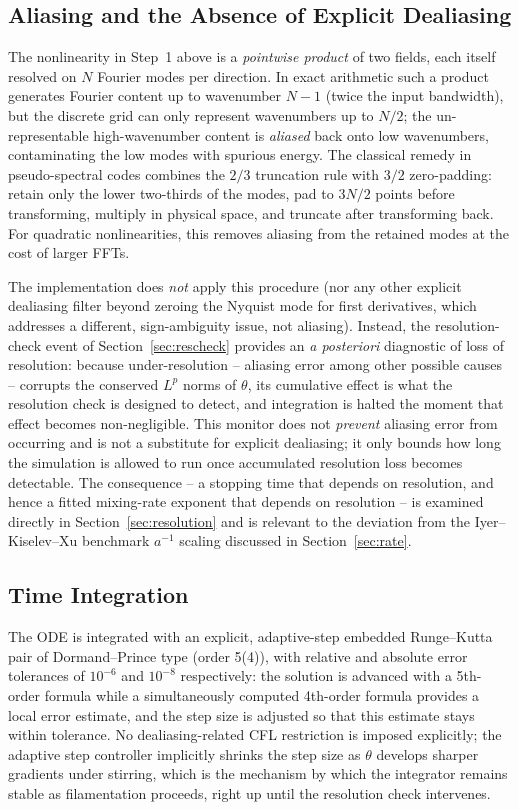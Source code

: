 \documentclass[12pt,a4paper]{article}
\theoremstyle{definition}
\theoremstyle{plain}
\begin{document}
\subsection{Aliasing and the Absence of Explicit Dealiasing}
\label{sec:aliasing}

The nonlinearity in Step~1 above is a \emph{pointwise product} of two
fields, each itself resolved on $N$ Fourier modes per direction. In exact
arithmetic such a product generates Fourier content up to wavenumber $N-1$
(twice the input bandwidth), but the discrete grid can only represent
wavenumbers up to $N/2$; the un-representable high-wavenumber content is
\emph{aliased} back onto low wavenumbers, contaminating the low modes with
spurious energy. The classical remedy in pseudo-spectral codes combines the
$2/3$ truncation rule with $3/2$ zero-padding: retain only the lower
two-thirds of the modes, pad to $3N/2$ points before transforming, multiply
in physical space, and truncate after transforming back. For quadratic
nonlinearities, this removes aliasing from the retained modes at the cost of
larger FFTs.

The implementation does \emph{not} apply this procedure (nor any other
explicit dealiasing filter beyond zeroing the Nyquist mode for first
derivatives, which addresses a different, sign-ambiguity issue, not
aliasing). Instead, the resolution-check event of
Section~\ref{sec:rescheck} provides an \emph{a posteriori} diagnostic of
loss of resolution: because under-resolution -- aliasing error among other
possible causes -- corrupts the conserved $L^p$ norms of $\theta$, its
cumulative effect is what the resolution check is designed to detect, and
integration is halted the moment that effect becomes non-negligible. This
monitor does not \emph{prevent} aliasing error from occurring and is not a
substitute for explicit dealiasing; it only bounds how long the simulation
is allowed to run once accumulated resolution loss becomes detectable. The
consequence -- a stopping time that
depends on resolution, and hence a fitted mixing-rate exponent that depends
on resolution -- is examined directly in Section~\ref{sec:resolution} and is
relevant to the deviation from the Iyer--Kiselev--Xu benchmark $a^{-1}$
scaling discussed in Section~\ref{sec:rate}.

\subsection{Time Integration}
\label{sec:timeint}

The ODE is integrated with an explicit, adaptive-step embedded
Runge--Kutta pair of Dormand--Prince type (order 5(4)), with relative and
absolute error tolerances of $10^{-6}$ and $10^{-8}$ respectively: the
solution is advanced with a 5th-order formula while a simultaneously
computed 4th-order formula provides a local error estimate, and the step
size is adjusted so that this estimate stays within tolerance. No
dealiasing-related CFL restriction is imposed explicitly; the adaptive step
controller implicitly shrinks the step size as $\theta$ develops sharper
gradients under stirring, which is the mechanism by which the integrator
remains stable as filamentation proceeds, right up until the resolution
check intervenes.
\end{document}

